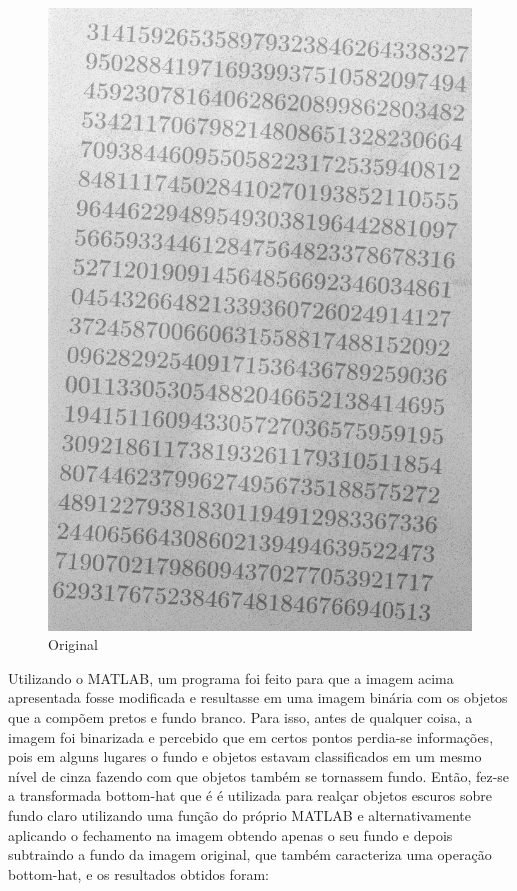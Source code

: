 \documentclass[journal]{IEEEtran}
\begin{document}
\begin{figure}[!htb]
	\centering
	\includegraphics[scale=0.2]{morf_test.png}
	\caption{Original}
	\label{Original}
\end{figure}
	
Utilizando o MATLAB, um programa foi feito para que a imagem acima apresentada fosse modificada e resultasse em uma imagem binária com os objetos que a compõem pretos e fundo branco. Para isso, antes de qualquer coisa, a imagem foi binarizada e percebido que em certos pontos perdia-se informações, pois em alguns lugares o fundo e objetos estavam classificados em um mesmo nível de cinza fazendo com que objetos também se tornassem fundo. Então, fez-se a transformada bottom-hat que é é utilizada para realçar objetos escuros sobre fundo claro utilizando uma função do próprio MATLAB e alternativamente aplicando o fechamento na imagem obtendo apenas o seu fundo e depois subtraindo a fundo da imagem original, que também caracteriza uma operação bottom-hat, e os resultados obtidos foram:
\end{document}
